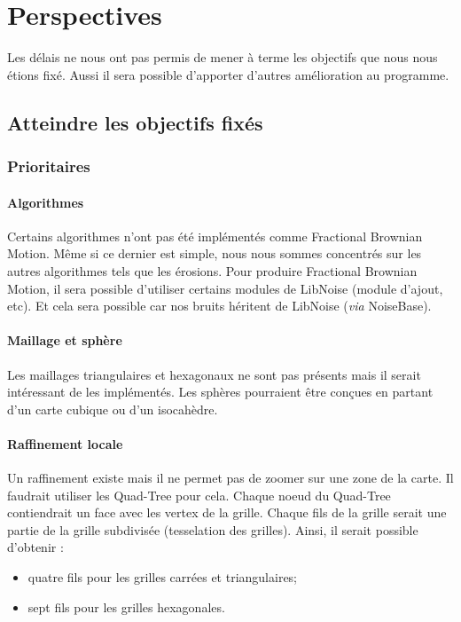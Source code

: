 \chapter{Perspectives}
Les délais ne nous ont pas permis de mener à terme les objectifs que nous nous étions fixé. 
Aussi il sera possible d'apporter d'autres amélioration au programme.

\section{Atteindre les objectifs fixés}

\subsection{Prioritaires}

\subsubsection{Algorithmes}
Certains algorithmes n'ont pas été implémentés comme Fractional Brownian Motion. Même si ce dernier est 
simple, nous nous sommes concentrés sur les autres algorithmes tels que les érosions. 
Pour produire Fractional Brownian Motion, il sera possible d'utiliser certains modules de LibNoise
(module d'ajout, etc). Et cela sera possible car nos bruits héritent de LibNoise (\textit{via} NoiseBase).
\subsubsection{Maillage et sphère}
Les maillages triangulaires et hexagonaux ne sont pas présents mais il serait intéressant de les
implémentés. Les sphères pourraient être conçues en partant d'un carte cubique ou d'un isocahèdre.
\subsubsection{Raffinement locale}
Un raffinement existe mais il ne permet pas de zoomer sur une zone de la carte. Il faudrait 
utiliser les Quad-Tree pour cela. Chaque noeud du Quad-Tree contiendrait un face avec les vertex de la grille.
Chaque fils de la grille serait une partie de la grille subdivisée (tesselation des grilles). Ainsi, il serait possible d'obtenir :
\begin{itemize}
 \item quatre fils pour les grilles carrées et triangulaires;
 \item sept fils pour les grilles hexagonales.
\end{itemize}

